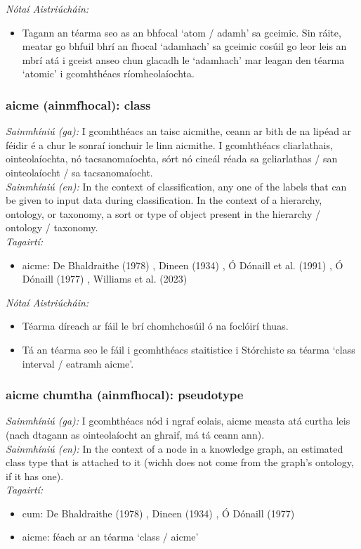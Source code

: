  \noindent \textit{Nótaí Aistriúcháin:}
\begin{itemize}
	\item Tagann an téarma seo as an bhfocal `atom / adamh' sa gceimic. Sin ráite, meatar go bhfuil bhrí an fhocal `adamhach' sa gceimic cosúil go leor leis an mbrí atá i gceist anseo chun glacadh le `adamhach' mar leagan den téarma `atomic' i gcomhthéacs ríomheolaíochta.
\end{itemize}


\subsubsection*{aicme (ainmfhocal): class}
 \noindent \textit{Sainmhíniú (ga):} I gcomhthéacs an taisc aicmithe, ceann ar bith de na lipéad ar féidir é a chur le sonraí ionchuir le linn aicmithe. I gcomhthéacs cliarlathais, ointeolaíochta, nó tacsanomaíochta, sórt nó cineál réada sa gcliarlathas / san ointeolaíocht / sa tacsanomaíocht.
\\
 \noindent \textit{Sainmhíniú (en):} In the context of classification, any one of the labels that can be given to input data during classification. In the context of a hierarchy, ontology, or taxonomy, a sort or type of object present in the hierarchy / ontology / taxonomy.
\\
 \noindent \textit{Tagairtí:}
\begin{itemize}
	\item aicme: De Bhaldraithe (1978) \cite{de-bhaldraithe}, Dineen (1934) \cite{dineen}, Ó Dónaill et al. (1991) \cite{focloir-beag}, Ó Dónaill (1977) \cite{odonaill}, Williams et al. (2023) \cite{storchiste}
\end{itemize}

 \noindent \textit{Nótaí Aistriúcháin:}
\begin{itemize}
	\item Téarma díreach ar fáil le brí chomhchosúil ó na foclóirí thuas.
	\item Tá an téarma seo le fáil i gcomhthéacs staitistice i Stórchiste sa téarma `class interval / eatramh aicme'.
\end{itemize}


\subsubsection*{aicme chumtha (ainmfhocal): pseudotype}
 \noindent \textit{Sainmhíniú (ga):} I gcomhthéacs nód i ngraf eolais, aicme measta atá curtha leis (nach dtagann as ointeolaíocht an ghraif, má tá ceann ann).
\\
 \noindent \textit{Sainmhíniú (en):} In the context of a node in a knowledge graph, an estimated class type that is attached to it (wichh does not come from the graph's ontology, if it has one).
\\
 \noindent \textit{Tagairtí:}
\begin{itemize}
	\item cum: De Bhaldraithe (1978) \cite{de-bhaldraithe}, Dineen (1934) \cite{dineen}, Ó Dónaill (1977) \cite{odonaill}
	\item aicme: féach ar an téarma `class / aicme'
\end{itemize}

